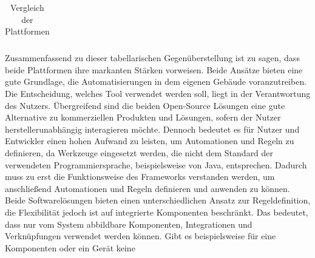 \begin{table}[hbt!]
\begin{center}
\begin{tabular}{| p{3.15cm} | p{6.3cm} | p{6.3cm} | }
            \end{tabular}
        \end{center}
        \caption{Vergleich der Plattformen \cite{sh-uni-comparison} \cite{msuttner-comparison} \cite{barclay-comparison}}
        \label{tab:comparisonTableHAOS-openHAB}
    \end{table}
    Zusammenfassend zu dieser tabellarischen Gegenüberstellung ist zu sagen, dass beide Plattformen ihre markanten Stärken vorweisen. 
    Beide Ansätze bieten eine gute Grundlage, die Automatisierungen in dem eigenen Gebäude voranzutreiben. Die Entscheidung, welches 
    Tool verwendet werden soll, liegt in der Verantwortung des Nutzers. Übergreifend sind die beiden Open-Source Lösungen eine gute 
    Alternative zu kommerziellen Produkten und Lösungen, sofern der Nutzer herstellerunabhängig interagieren möchte. Dennoch 
    bedeutet es für Nutzer und Entwickler einen hohen Aufwand zu leisten, um Automationen und Regeln zu definieren, da 
    Werkzeuge eingesetzt werden, die nicht dem Standard der verwendeten Programmiersprache, beispielsweise von Java, 
    entsprechen. Dadurch muss zu erst die Funktionsweise des Frameworks verstanden werden, um anschließend Automationen und 
    Regeln definieren und anwenden zu können. 
    \\
    Beide Softwarelösungen bieten einen unterschiedlichen Ansatz zur Regeldefinition, die Flexibilität 
    jedoch ist auf integrierte Komponenten beschränkt. Das bedeutet, dass nur vom System abbildbare Komponenten, 
    Integrationen und Verknüpfungen verwendet werden können. Gibt es beispielsweise für eine Komponenten oder ein Gerät keine 

